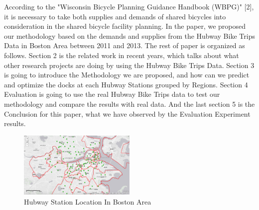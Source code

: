\documentclass[journal, letterpaper]{IEEEtran}
\begin{document}


According to the "Wisconsin Bicycle Planning Guidance Handbook (WBPG)" [2], it is necessary to take both supplies and demands of shared bicycles into consideration in the shared bicycle facility planning. In the paper, we proposed our methodology based on the demands and supplies from the Hubway Bike Trips Data in Boston Area between 2011 and 2013. The rest of paper is organized as follows. Section 2 is the related work in recent years, which talks about what other research projects are doing by using the Hubway Bike Trips Data. Section 3 is going to introduce the Methodology we are proposed, and how can we predict and optimize the docks at each Hubway Stations grouped by Regions. Section 4 Evaluation is going to use the real Hubway Bike Trips data to test our methodology and compare the results with real data. And the last section 5 is the Conclusion for this paper, what we have observed by the Evaluation Experiment results. 

\begin{figure}
  \includegraphics[width=0.5\textwidth]{stationdot.jpg}
  \caption{Hubway Station Location In Boston Area}
  \label{fig:1}
\end{figure}
\end{document}
